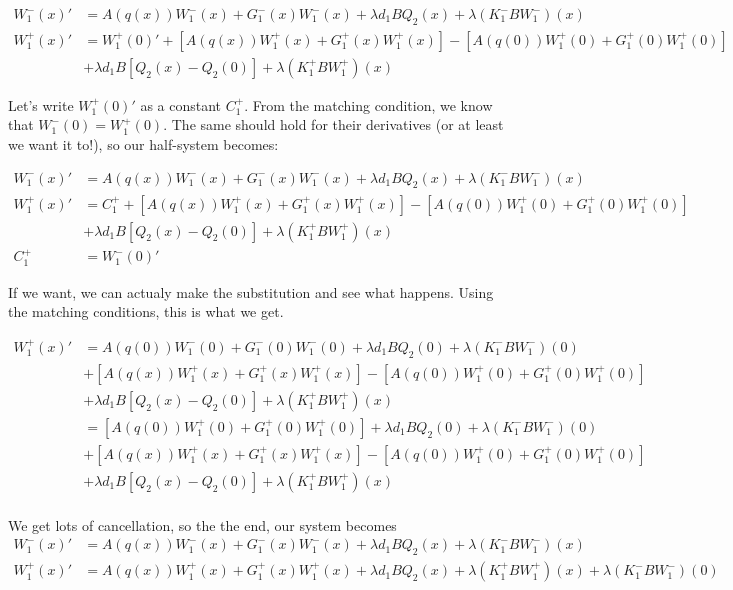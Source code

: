 \documentclass[12pt]{article}
\begin{document}
\begin{align*}
W_1^-(x)' &= A(q(x)) W_1^-(x) + G_1^-(x) W_1^-(x) + \lambda d_1 B Q_2(x) + \lambda (K_1^- B W_1^-)(x) \\
W_1^+(x)' &= W_1^+(0)' + [A(q(x)) W_1^+(x) + G_1^+(x) W_1^+(x)]
 - [A(q(0)) W_1^+(0) + G_1^+(0) W_1^+(0)] \\
&+ \lambda d_1 B[ Q_2(x) - Q_2(0) ] + \lambda (K_1^+ B W_1^+)(x)
\end{align*}

Let's write $W_1^+(0)'$ as a constant $C_1^+$. From the matching condition, we know that $W_1^-(0) = W_1^+(0)$. The same should hold for their derivatives (or at least we want it to!), so our half-system becomes:

\begin{align*}
W_1^-(x)' &= A(q(x)) W_1^-(x) + G_1^-(x) W_1^-(x) + \lambda d_1 B Q_2(x) + \lambda (K_1^- B W_1^-)(x) \\
W_1^+(x)' &= C_1^+ + [A(q(x)) W_1^+(x) + G_1^+(x) W_1^+(x)] - [A(q(0)) W_1^+(0) + G_1^+(0) W_1^+(0)] \\
&+ \lambda d_1 B[ Q_2(x) - Q_2(0) ] + \lambda (K_1^+ B W_1^+)(x) \\
C_1^+ &= W_1^-(0)'
\end{align*}

If we want, we can actualy make the substitution and see what happens. Using the matching conditions, this is what we get.

\begin{align*}
W_1^+(x)' &= A(q(0)) W_1^-(0) + G_1^-(0) W_1^-(0) + \lambda d_1 B Q_2(0) + \lambda (K_1^- B W_1^-)(0) \\
&+ [A(q(x)) W_1^+(x) + G_1^+(x) W_1^+(x)] - [A(q(0)) W_1^+(0) + G_1^+(0) W_1^+(0)] \\
&+ \lambda d_1 B[ Q_2(x) - Q_2(0) ] + \lambda (K_1^+ B W_1^+)(x) \\
&= [A(q(0)) W_1^+(0) + G_1^+(0) W_1^+(0)] + \lambda d_1 B Q_2(0) + \lambda (K_1^- B W_1^-)(0) \\
&+ [A(q(x)) W_1^+(x) + G_1^+(x) W_1^+(x)] - [A(q(0)) W_1^+(0) + G_1^+(0) W_1^+(0)] \\
&+ \lambda d_1 B[ Q_2(x) - Q_2(0) ] + \lambda (K_1^+ B W_1^+)(x) \\ 
\end{align*}

We get lots of cancellation, so the the end, our system becomes
\begin{align*}
W_1^-(x)' &= A(q(x)) W_1^-(x) + G_1^-(x) W_1^-(x) + \lambda d_1 B Q_2(x) + \lambda (K_1^- B W_1^-)(x) \\
W_1^+(x)' &= A(q(x)) W_1^+(x) + G_1^+(x) W_1^+(x) + \lambda d_1 B Q_2(x) + \lambda (K_1^+ B W_1^+)(x) + \lambda (K_1^- B W_1^-)(0)  
\end{align*}
\end{document}
